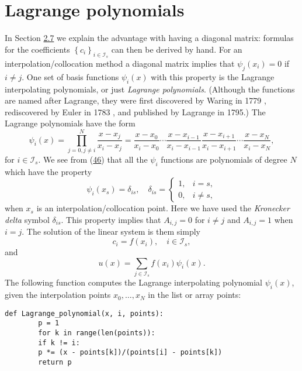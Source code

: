 \documentclass[../main.tex]{subfiles}
\begin{document}
	\section[Lagrange polynomials]{Lagrange polynomials}
	\label{sec:sec_2_11}
	\noindent In Section \hyperref[sec:sec_2_7]{2.7} we explain the advantage with having a diagonal matrix: formulas for the coefficients $\left\{c_{i}\right\}_{i \in \mathcal{I}_{s}}$ can then be derived by hand. For an interpolation/collocation method a diagonal matrix implies that $\psi_{j}\left(x_{i}\right)=0$ if $i \neq j$. One set of basis functions $\psi_{i}(x)$ with this property is the Lagrange interpolating polynomials, or just \textit{Lagrange polynomials}. (Although the functions are named after Lagrange, they were first discovered by Waring in 1779 , rediscovered by
	Euler in 1783 , and published by Lagrange in 1795.) The Lagrange polynomials have the form
	\begin{equation}\label{eqa46}
		\psi_{i}(x)=\prod_{j=0, j \neq i}^{N} \frac{x-x_{j}}{x_{i}-x_{j}}=\frac{x-x_{0}}{x_{i}-x_{0}} \cdots \frac{x-x_{i-1}}{x_{i}-x_{i-1}} \frac{x-x_{i+1}}{x_{i}-x_{i+1}} \cdots \frac{x-x_{N}}{x_{i}-x_{N}},
	\end{equation}
	for $i \in \mathcal{I}_{s}$. We see from (\hyperref[eqa46]{46}) that all the $\psi_{i}$ functions are polynomials of degree $N$ which have the property
	\begin{equation}\label{eqa47}
		\psi_{i}\left(x_{s}\right)=\delta_{i s}, \quad \delta_{i s}= \begin{cases}1, & i=s, \\ 0, & i \neq s,\end{cases}
	\end{equation}
	when $x_{s}$ is an interpolation/collocation point. Here we have used the \textit{Kronecker delta} symbol $\delta_{i s}$. This property implies that $A_{i, j}=0$ for $i \neq j$ and $A_{i, j}=1$ when $i=j$. The solution of the linear system is them simply
	\begin{equation}\label{eqa48}
		c_{i}=f\left(x_{i}\right), \quad i \in \mathcal{I}_{s},
	\end{equation}
	and
	\begin{equation}\label{eqa49}
		u(x)=\sum_{j \in \mathcal{I}_{s}} f\left(x_{i}\right) \psi_{i}(x).
	\end{equation}
	The following function computes the Lagrange interpolating polynomial $\psi_{i}(x)$, given the interpolation points $x_{0}, \ldots, x_{N}$ in the list or array points:
	\begin{lstlisting}[numbers=none]
		def Lagrange_polynomial(x, i, points):
		p = 1
		for k in range(len(points)):
		if k != i:
		p *= (x - points[k])/(points[i] - points[k])
		return p
	\end{lstlisting}
\end{document}

